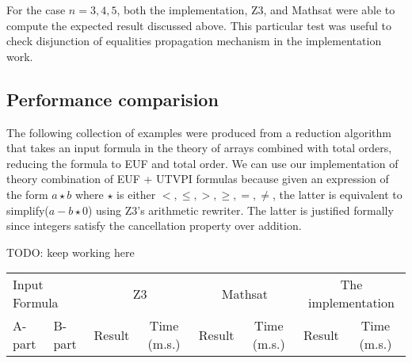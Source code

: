 For the case $n = 3, 4, 5$, both the implementation, Z3, and Mathsat were able
to compute the expected result discussed above. This particular test
was useful to check disjunction of equalities propagation mechanism in the
implementation work.

\subsection{Performance comparision}

The following collection of examples were produced from a reduction 
algorithm that takes an input formula in the theory of arrays combined with
total orders, reducing the formula to EUF and total order. We can use our
implementation of theory combination of EUF + UTVPI formulas because 
given an expression of the form $a \star b$ where
$\star$ is either $<, \leq, >, \geq, =, \neq$, 
the latter is equivalent to 
simplify($a - b \star 0$) using Z3's arithmetic rewriter. 
The latter is justified formally since integers 
satisfy the cancellation property over addition.


TODO: keep working here

\begin{tabular}{llcccccc} \toprule
  \multicolumn{2}{l}{Input Formula} & \multicolumn{2}{c}{Z3}& \multicolumn{2}{c}{Mathsat}& \multicolumn{2}{c}{The implementation} 
  \\\cmidrule(lr){1-2}\cmidrule(lr){3-4}\cmidrule(lr){5-6}\cmidrule(lr){7-8}
  A-part & B-part & Result & Time (m.s.) & Result & Time (m.s.) & Result & Time (m.s.) \\
  
\end{tabular}


